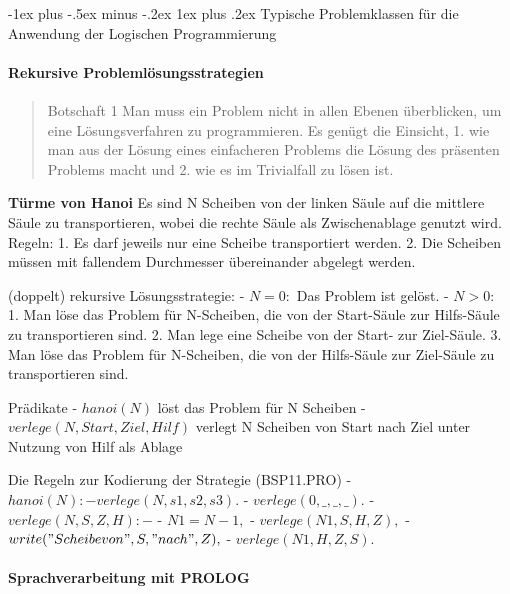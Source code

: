 \documentclass[a4paper]{article}
\makeatletter
\renewcommand{\subsubsection}{\@startsection{subsubsection}{3}{0mm}%
                {-1ex plus -.5ex minus -.2ex}%
                {1ex plus .2ex}%
                {\normalfont\small\bfseries}}
\makeatother
\begin{document}
\begin{multicols}{3}
  \subsubsection{Typische Problemklassen für die Anwendung der Logischen
    Programmierung}\label{typische-problemklassen-fuxfcr-die-anwendung-der-logischen-programmierung}

  \paragraph{Rekursive
    Problemlösungsstrategien}\label{rekursive-problemluxf6sungsstrategien}

  \begin{quote}
    Botschaft 1 Man muss ein Problem nicht in allen Ebenen überblicken, um
    eine Lösungsverfahren zu programmieren. Es genügt die Einsicht, 1. wie
    man aus der Lösung eines einfacheren Problems die Lösung des präsenten
    Problems macht und 2. wie es im Trivialfall zu lösen ist.
  \end{quote}

  \textbf{Türme von Hanoi} Es sind N Scheiben von der linken Säule auf die
  mittlere Säule zu transportieren, wobei die rechte Säule als
  Zwischenablage genutzt wird. Regeln: 1. Es darf jeweils nur eine Scheibe
  transportiert werden. 2. Die Scheiben müssen mit fallendem Durchmesser
  übereinander abgelegt werden.

  (doppelt) rekursive Lösungsstrategie: - $N = 0:$ Das Problem ist gelöst.
  - $N > 0:$ 1. Man löse das Problem für N-Scheiben, die von der
  Start-Säule zur Hilfs-Säule zu transportieren sind. 2. Man lege eine
  Scheibe von der Start- zur Ziel-Säule. 3. Man löse das Problem für
  N-Scheiben, die von der Hilfs-Säule zur Ziel-Säule zu transportieren
  sind.

  Prädikate - $hanoi(N)$ löst das Problem für N Scheiben -
  $verlege(N,Start,Ziel,Hilf)$ verlegt N Scheiben von Start nach Ziel
  unter Nutzung von Hilf als Ablage

  Die Regeln zur Kodierung der Strategie (BSP11.PRO) -
  $hanoi( N ) :- verlege( N , s1 , s2 , s3 ).$ -
  $verlege( 0 , \_ , \_ , \_ ).$ - $verlege( N , S , Z , H ) :-$ -
  $N1 = N - 1,$ - $verlege( N1 , S , H , Z ),$ -
  $write("Scheibe von ", S," nach ", Z),$ - $verlege( N1 , H , Z , S ).$

  \paragraph{Sprachverarbeitung mit
    PROLOG}\label{sprachverarbeitung-mit-prolog}


\end{multicols}
\end{document}
